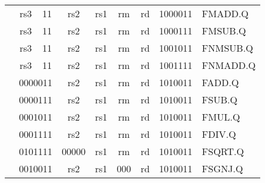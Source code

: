 \begin{table}[p]
\begin{small}
\begin{center}
\begin{tabular}{p{0in}p{0.4in}p{0.05in}p{0.05in}p{0.05in}p{0.05in}p{0.4in}p{0.6in}p{0.4in}p{0.6in}p{0.7in}l}
&
\multicolumn{2}{|c|}{rs3} &
\multicolumn{2}{c|}{11} &
\multicolumn{2}{c|}{rs2} &
\multicolumn{1}{c|}{rs1} &
\multicolumn{1}{c|}{rm} &
\multicolumn{1}{c|}{rd} &
\multicolumn{1}{c|}{1000011} & FMADD.Q \\
\cline{2-11}


&
\multicolumn{2}{|c|}{rs3} &
\multicolumn{2}{c|}{11} &
\multicolumn{2}{c|}{rs2} &
\multicolumn{1}{c|}{rs1} &
\multicolumn{1}{c|}{rm} &
\multicolumn{1}{c|}{rd} &
\multicolumn{1}{c|}{1000111} & FMSUB.Q \\
\cline{2-11}


&
\multicolumn{2}{|c|}{rs3} &
\multicolumn{2}{c|}{11} &
\multicolumn{2}{c|}{rs2} &
\multicolumn{1}{c|}{rs1} &
\multicolumn{1}{c|}{rm} &
\multicolumn{1}{c|}{rd} &
\multicolumn{1}{c|}{1001011} & FNMSUB.Q \\
\cline{2-11}


&
\multicolumn{2}{|c|}{rs3} &
\multicolumn{2}{c|}{11} &
\multicolumn{2}{c|}{rs2} &
\multicolumn{1}{c|}{rs1} &
\multicolumn{1}{c|}{rm} &
\multicolumn{1}{c|}{rd} &
\multicolumn{1}{c|}{1001111} & FNMADD.Q \\
\cline{2-11}


&
\multicolumn{4}{|c|}{0000011} &
\multicolumn{2}{c|}{rs2} &
\multicolumn{1}{c|}{rs1} &
\multicolumn{1}{c|}{rm} &
\multicolumn{1}{c|}{rd} &
\multicolumn{1}{c|}{1010011} & FADD.Q \\
\cline{2-11}


&
\multicolumn{4}{|c|}{0000111} &
\multicolumn{2}{c|}{rs2} &
\multicolumn{1}{c|}{rs1} &
\multicolumn{1}{c|}{rm} &
\multicolumn{1}{c|}{rd} &
\multicolumn{1}{c|}{1010011} & FSUB.Q \\
\cline{2-11}


&
\multicolumn{4}{|c|}{0001011} &
\multicolumn{2}{c|}{rs2} &
\multicolumn{1}{c|}{rs1} &
\multicolumn{1}{c|}{rm} &
\multicolumn{1}{c|}{rd} &
\multicolumn{1}{c|}{1010011} & FMUL.Q \\
\cline{2-11}


&
\multicolumn{4}{|c|}{0001111} &
\multicolumn{2}{c|}{rs2} &
\multicolumn{1}{c|}{rs1} &
\multicolumn{1}{c|}{rm} &
\multicolumn{1}{c|}{rd} &
\multicolumn{1}{c|}{1010011} & FDIV.Q \\
\cline{2-11}


&
\multicolumn{4}{|c|}{0101111} &
\multicolumn{2}{c|}{00000} &
\multicolumn{1}{c|}{rs1} &
\multicolumn{1}{c|}{rm} &
\multicolumn{1}{c|}{rd} &
\multicolumn{1}{c|}{1010011} & FSQRT.Q \\
\cline{2-11}


&
\multicolumn{4}{|c|}{0010011} &
\multicolumn{2}{c|}{rs2} &
\multicolumn{1}{c|}{rs1} &
\multicolumn{1}{c|}{000} &
\multicolumn{1}{c|}{rd} &
\multicolumn{1}{c|}{1010011} & FSGNJ.Q \\
\cline{2-11}



\end{tabular}
\end{center}
\end{small}
\end{table}
